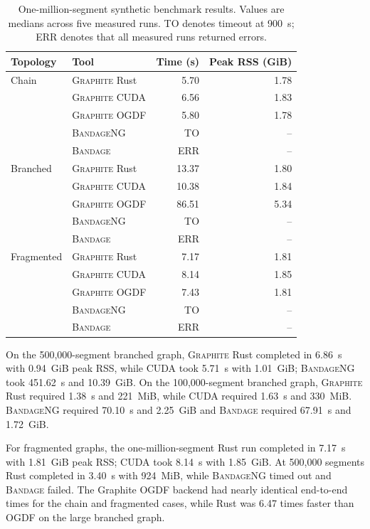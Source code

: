 \documentclass[11pt]{article}
\newcommand{\graphite}{\textsc{Graphite}\xspace}
\newcommand{\bandage}{\textsc{Bandage}\xspace}
\newcommand{\bandageng}{\textsc{BandageNG}\xspace}
\begin{document}
\begin{table}[ht]
\centering
\caption{One-million-segment synthetic benchmark results. Values are medians across five measured runs. TO denotes timeout at 900~s; ERR denotes that all measured runs returned errors.}
\label{tab:synthetic-million}
\small
\begin{tabular}{llrr}
\toprule
Topology & Tool & Time (s) & Peak RSS (GiB)\\
\midrule
Chain & \graphite{} Rust & 5.70 & 1.78\\
      & \graphite{} CUDA & 6.56 & 1.83\\
      & \graphite{} OGDF & 5.80 & 1.78\\
      & \bandageng & TO & --\\
      & \bandage & ERR & --\\
\addlinespace
Branched & \graphite{} Rust & 13.37 & 1.80\\
         & \graphite{} CUDA & 10.38 & 1.84\\
         & \graphite{} OGDF & 86.51 & 5.34\\
         & \bandageng & TO & --\\
         & \bandage & ERR & --\\
\addlinespace
Fragmented & \graphite{} Rust & 7.17 & 1.81\\
           & \graphite{} CUDA & 8.14 & 1.85\\
           & \graphite{} OGDF & 7.43 & 1.81\\
           & \bandageng & TO & --\\
           & \bandage & ERR & --\\
\bottomrule
\end{tabular}
\end{table}

On the 500,000-segment branched graph, \graphite Rust completed in 6.86~s with 0.94~GiB peak RSS, while CUDA took 5.71~s with 1.01~GiB; \bandageng took 451.62~s and 10.39~GiB. On the 100,000-segment branched graph, \graphite Rust required 1.38~s and 221~MiB, while CUDA required 1.63~s and 330~MiB. \bandageng required 70.10~s and 2.25~GiB and \bandage required 67.91~s and 1.72~GiB.

For fragmented graphs, the one-million-segment Rust run completed in 7.17~s with 1.81~GiB peak RSS; CUDA took 8.14~s with 1.85~GiB. At 500,000 segments Rust completed in 3.40~s with 924~MiB, while \bandageng timed out and \bandage failed. The Graphite OGDF backend had nearly identical end-to-end times for the chain and fragmented cases, while Rust was 6.47 times faster than OGDF on the large branched graph.
\end{document}
